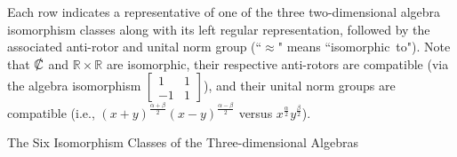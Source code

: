 \documentclass{amsart}
\numberwithin{equation}{section}
\theoremstyle{definition}
\numberwithin{theorem}{section}
\begin{document}
\bigskip


 {\small Each row indicates a representative  of one of the three two-dimensional algebra isomorphism classes along with its left regular representation, followed by the associated anti-rotor and unital norm group (``$\approx$" means \mbox{``isomorphic to"}). Note that  $\slashed{\mathbb{C}}$ and $\mathbb{R}\times\mathbb{R}$ are isomorphic, their respective anti-rotors are compatible (via the algebra isomorphism $\left[\begin{array}{ccc}
 1 & 1   \\ 
 -1 & 1    
\end{array}\right]$), and their unital norm groups are  compatible (i.e., $(x+y)^{\frac{\alpha+\beta}{2}}(x-y)^{\frac{\alpha-\beta}{2}}$ versus $x^\frac{\alpha}{2} y^\frac{\beta}{2}$).  }

\vfill
\hspace{0pt}
\pagebreak



\hspace{0pt}
\vfill


  \centerline{\Large The Six Isomorphism Classes of the Three-dimensional Algebras }

\vspace{.5cm}
\end{document}
